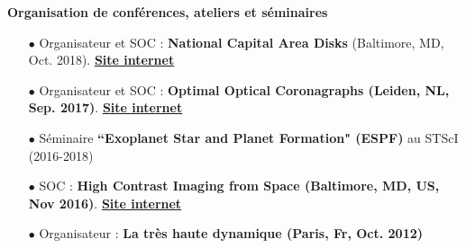 \documentclass[11pt, a4paper, french]{article}
\begin{document}
\textbf{Organisation de conférences, ateliers et séminaires}\\
\vspace{-0.1cm}
\begin{itemize} \itemsep 5pt
    \item[$\bullet$] \small Organisateur et SOC : \textbf{National Capital Area Disks} (Baltimore, MD, Oct. 2018). \href{https://sites.google.com/view/ncad7-at-jhu/ncad7}{\underline{\textbf{Site internet}}}
    \item[$\bullet$] \small Organisateur et SOC : \textbf{Optimal Optical Coronagraphs (Leiden, NL, Sep. 2017)}. \href{https://www.lorentzcenter.nl/lc/web/2017/924/info.php3?wsid=924&venue=Snellius}{\underline{\textbf{Site internet}}}
    \item[$\bullet$]\small Séminaire \textbf{``Exoplanet Star and Planet Formation" (ESPF)} au STScI (2016-2018)
    \item[$\bullet$] \small SOC : \textbf{High Contrast Imaging from Space (Baltimore, MD, US, Nov 2016)}.  \href{http://www.cvent.com/events/high-contrast-imaging-in-space-workshop/event-summary-eb3bb6bd54a342c5a15678daa49be683.aspx}{\underline{\textbf{Site internet}}}
    \item[$\bullet$] \small Organisateur : \textbf{La très haute dynamique (Paris, Fr, Oct. 2012)}
\end{itemize}
\vspace{0.4cm}
\end{document}
